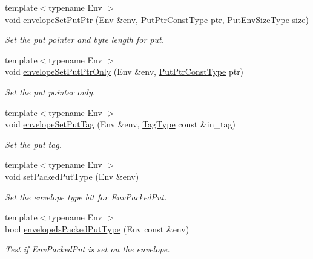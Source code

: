 \begin{DoxyCompactItemize}
{\footnotesize template$<$typename Env $>$ }\\void \hyperlink{namespacevt_a17f0a4c162ef2b8337dfeab15f1c3a5b}{envelope\+Set\+Put\+Ptr} (Env \&env, \hyperlink{namespacevt_a494d6c6dc5cdb9a8d61eaedfa2c4d4f3}{Put\+Ptr\+Const\+Type} ptr, \hyperlink{namespacevt_aa241444e21c15238e185923792814fe4}{Put\+Env\+Size\+Type} size)
\begin{DoxyCompactList}\small\item\em Set the put pointer and byte length for put. \end{DoxyCompactList}\item 
{\footnotesize template$<$typename Env $>$ }\\void \hyperlink{namespacevt_a4e63ee5cc991a0a2052300feaae4bd4e}{envelope\+Set\+Put\+Ptr\+Only} (Env \&env, \hyperlink{namespacevt_a494d6c6dc5cdb9a8d61eaedfa2c4d4f3}{Put\+Ptr\+Const\+Type} ptr)
\begin{DoxyCompactList}\small\item\em Set the put pointer only. \end{DoxyCompactList}\item 
{\footnotesize template$<$typename Env $>$ }\\void \hyperlink{namespacevt_a43128d4858572c9b60cfc1c420acc882}{envelope\+Set\+Put\+Tag} (Env \&env, \hyperlink{namespacevt_a84ab281dae04a52a4b243d6bf62d0e52}{Tag\+Type} const \&in\+\_\+tag)
\begin{DoxyCompactList}\small\item\em Set the put tag. \end{DoxyCompactList}\item 
{\footnotesize template$<$typename Env $>$ }\\void \hyperlink{namespacevt_a2206947364b94e9c7dba38df257d095b}{set\+Packed\+Put\+Type} (Env \&env)
\begin{DoxyCompactList}\small\item\em Set the envelope type bit for {\ttfamily Env\+Packed\+Put}. \end{DoxyCompactList}\item 
{\footnotesize template$<$typename Env $>$ }\\bool \hyperlink{namespacevt_aba8a23bc60c8177816d94e913aed6107}{envelope\+Is\+Packed\+Put\+Type} (Env const \&env)
\begin{DoxyCompactList}\small\item\em Test if {\ttfamily Env\+Packed\+Put} is set on the envelope. \end{DoxyCompactList}\item 

\end{DoxyCompactItemize}
